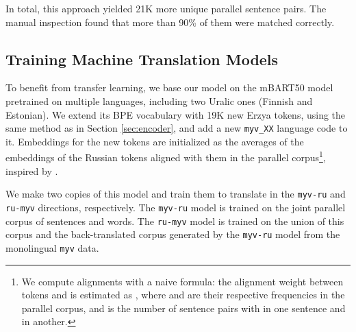 \documentclass[11pt]{article}
\begin{document}
In total, this approach yielded 21K more unique parallel sentence pairs. The manual inspection found that more than 90\% of them were matched correctly.

\subsection{Training Machine Translation Models}
To benefit from transfer learning, we base our model on the mBART50 model \cite{tang2020multilingual} pretrained on multiple languages, including two Uralic ones (Finnish and Estonian). We extend its BPE vocabulary with 19K new Erzya tokens, using the same method as in Section \ref{sec:encoder}, and add a new \texttt{myv\_XX} language code to it. Embeddings for the new tokens are initialized as the averages of the embeddings of the Russian tokens aligned with them in the parallel corpus\footnote{We compute alignments with a naive formula: the alignment weight between tokens  and  is estimated as , where  and  are their respective frequencies in the parallel corpus, and  is the number of sentence pairs with  in one sentence and  in another.}, inspired by \citet{xu-hong-2022-sub}.

We make two copies of this model and train them to translate in the \texttt{myv-ru} and \texttt{ru-myv} directions, respectively. The \texttt{myv-ru} model is trained on the joint parallel corpus of sentences and words. The \texttt{ru-myv} model is trained on the union of this corpus and the back-translated corpus generated by the \texttt{myv-ru} model from the monolingual \texttt{myv} data. 
\end{document}
